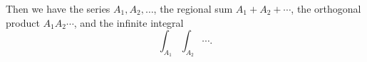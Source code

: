 \documentclass{book}
\begin{document}
Then we have the series $A_1, A_2,\dotsc$,
the regional sum $A_1+A_2 +\dotsb $,
the orthogonal product $A_1 A_2 \dotsm $,
and the infinite integral
$$\int_{A_1}\int_{A_2}\dotsi.$$
\end{document}

